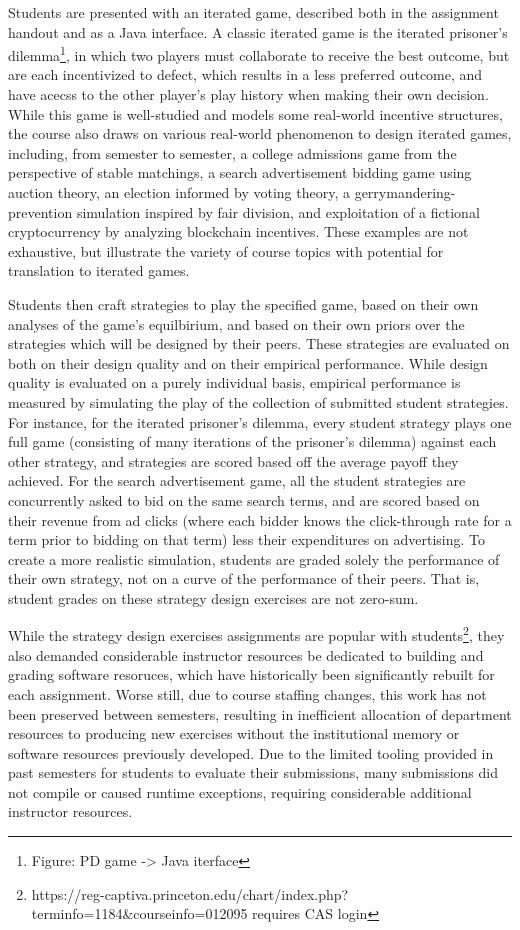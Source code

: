 \documentclass[pageno]{jpaper}
\begin{document}
Students are presented with an iterated game, described both in the assignment handout and as a Java interface.
A classic iterated game is the iterated prisoner's dilemma\footnote{Figure: PD game -> Java iterface}, in which two players must collaborate to receive the best outcome, but are each incentivized to defect, which results in a less preferred outcome, and have acecss to the other player's play history when making their own decision.
While this game is well-studied and models some real-world incentive structures, the course also draws on various real-world phenomenon to design iterated games, including, from semester to semester, a college admissions game from the perspective of stable matchings, a search advertisement bidding game using auction theory, an election informed by voting theory, a gerrymandering-prevention simulation inspired by fair division, and exploitation of a fictional cryptocurrency by analyzing blockchain incentives.
These examples are not exhaustive, but illustrate the variety of course topics with potential for translation to iterated games.

Students then craft strategies to play the specified game, based on their own analyses of the game's equilbirium, and based on their own priors over the strategies which will be designed by their peers.
These strategies are evaluated on both on their design quality and on their empirical performance.
While design quality is evaluated on a purely individual basis, empirical performance is measured by simulating the play of the collection of submitted student strategies.
For instance, for the iterated prisoner's dilemma, every student strategy plays one full game (consisting of many iterations of the prisoner's dilemma) against each other strategy, and strategies are scored based off the average payoff they achieved.
For the search advertisement game, all the student strategies are concurrently asked to bid on the same search terms, and are scored based on their revenue from ad clicks (where each bidder knows the click-through rate for a term prior to bidding on that term) less their expenditures on advertising.
To create a more realistic simulation, students are graded solely the performance of their own strategy, not on a curve of the performance of their peers.
That is, student grades on these strategy design exercises are not zero-sum.

While the strategy design exercises assignments are popular with students\footnote{https://reg-captiva.princeton.edu/chart/index.php?terminfo=1184\&courseinfo=012095 requires CAS login}, they also demanded considerable instructor resources be dedicated to building and grading software resoruces, which have historically been significantly rebuilt for each assignment.
Worse still, due to course staffing changes, this work has not been preserved between semesters, resulting in inefficient allocation of department resources to producing new exercises without the institutional memory or software resources previously developed.
Due to the limited tooling provided in past semesters for students to evaluate their submissions, many submissions did not compile or caused runtime exceptions, requiring considerable additional instructor resources.
\end{document}
